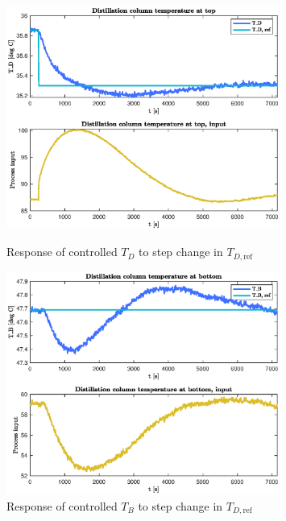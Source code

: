 \documentclass[12pt]{article}
\begin{document}
\begin{figure}[p]
\centering
\includegraphics[width=0.8\textwidth]{../Systemanalyse/Log_Data_to_Matlab/Figurer/LV_tuning/T_D_closed_loop_with_T_D_step.eps}
\caption{Response of controlled $T_D$ to step change in $T_{D, \textrm{ref}}$}
\label{fig:TD_TD_cl}

\includegraphics[width=0.8\textwidth]{../Systemanalyse/Log_Data_to_Matlab/Figurer/LV_tuning/T_B_closed_loop_with_T_D_step.eps}
\caption{Response of controlled $T_B$ to step change in $T_{D, \textrm{ref}}$}
\label{fig:TB_TD_cl}
\end{figure}
\end{document}
